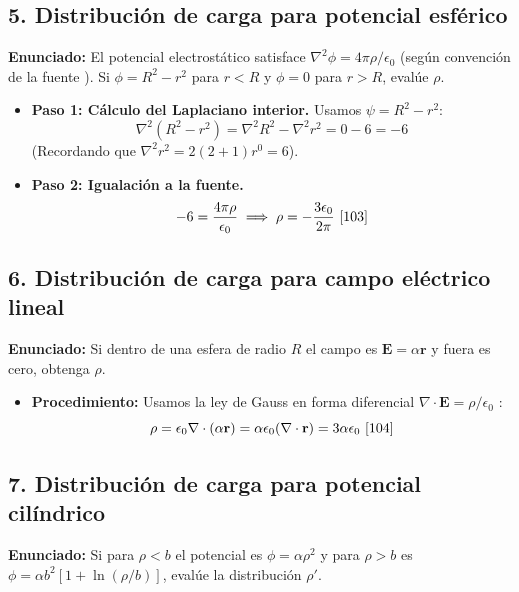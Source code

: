 \documentclass[a4paper]{article}
\begin{document}
\subsection*{5. Distribución de carga para potencial esférico}
\textbf{Enunciado:} El potencial electrostático satisface $\nabla^2 \phi = 4\pi \rho / \epsilon_0$ (según convención de la fuente \cite{103}). Si $\phi = R^2 - r^2$ para $r < R$ y $\phi = 0$ para $r > R$, evalúe $\rho$.

\begin{itemize}
    \item \textbf{Paso 1: Cálculo del Laplaciano interior.} Usamos $\psi = R^2 - r^2$:
    \begin{equation*}
        \nabla^2 (R^2 - r^2) = \nabla^2 R^2 - \nabla^2 r^2 = 0 - 6 = -6
    \end{equation*}
    (Recordando que $\nabla^2 r^2 = 2(2+1)r^0 = 6$).
    \item \textbf{Paso 2: Igualación a la fuente.}
    \begin{equation*}
        -6 = \frac{4\pi \rho}{\epsilon_0} \implies \rho = -\frac{3 \epsilon_0}{2\pi} \text{ \cite{103}}
    \end{equation*}
\end{itemize}

\subsection*{6. Distribución de carga para campo eléctrico lineal}
\textbf{Enunciado:} Si dentro de una esfera de radio $R$ el campo es $\mathbf{E} = \alpha \mathbf{r}$ y fuera es cero, obtenga $\rho$.

\begin{itemize}
    \item \textbf{Procedimiento:} Usamos la ley de Gauss en forma diferencial $\nabla \cdot \mathbf{E} = \rho / \epsilon_0$ \cite{92}:
    \begin{equation*}
        \rho = \epsilon_0 \nabla \cdot (\alpha \mathbf{r}) = \alpha \epsilon_0 (\nabla \cdot \mathbf{r}) = 3\alpha \epsilon_0 \text{ \cite{104}}
    \end{equation*}
\end{itemize}

\subsection*{7. Distribución de carga para potencial cilíndrico}
\textbf{Enunciado:} Si para $\rho < b$ el potencial es $\phi = \alpha \rho^2$ y para $\rho > b$ es $\phi = \alpha b^2 [1 + \ln(\rho/b)]$, evalúe la distribución $\rho'$.
\end{document}
